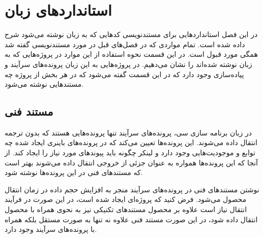 %
% 
% 
% 
%
\chapter{استانداردهای زبان }

در این فصل استانداردهایی برای مستندنویسی کدهایی که به زبان  نوشته
می‌شود شرح داده شده است. تمام مواردی که در فصل‌های قبل در مورد مستندنویسی گفته
شد همگی مورد قبول است. در این قسمت نحوه استفاده از این موارد در پروژه‌هایی که به
زبان   نوشته شده‌اند را نشان می‌دهیم. در پروژه‌هایی به این زبان
پرونده‌های سرآیند و پیاده‌سازی وجود دارد که در این قسمت گفته می‌شود که در هر بخش
از پروژه چه مستندهایی نوشته می‌شود.

\section{مستند فنی}

در زبان برنامه سازی سی، پرونده‌های سرآیند تنها پرونده‌هایی هستند که بدون ترجمه
انتقال داده می‌شوند. این پرونده‌ها تعیین می‌کند که در پرونده‌های باینری ایجاد
شده چه توابع و موجودیت‌هایی وجود دارد و لینکر چگونه باید پیوندهای مورد نیاز را
ایجاد کند. از آنجا که این پرونده‌ها همواره به عنوان جزئی از خروجی انتقال داده
می‌شوند بهتر است که مستندهای فنی در این پرونده‌ها نوشته شود.

نوشتن مستندهای فنی در پرونده‌های سرآیند منجر به افزایش حجم داده در زمان انتقال
محصول می‌شود. فرض کنید که پروژه‌ای ایجاد شده است، در این صورت در فرآیند انتقال
نیاز است علاوه بر محصول مستندهای تکنیکی نیز به نحوی همراه با محصول انتقال داده
شود، در این صورت مستند فنی علاوه نه تنها به صورت مستقل بلکه همراه با پرونده‌های
سرآیند وجود دارد.

